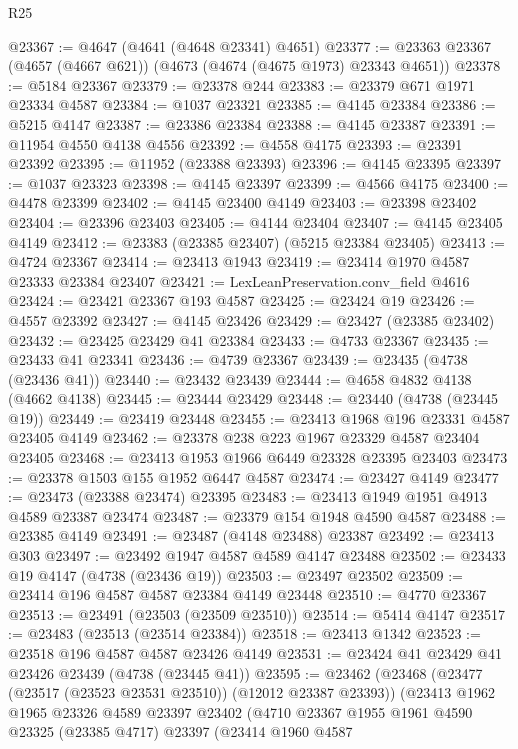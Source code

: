 \begin{lexlean}{R25}
\begin{coremodule}
@23367 := @4647 (@4641 (@4648 @23341) @4651)
@23377 := @23363 @23367 (@4657 (@4667 @621)) (@4673 (@4674 (@4675 @1973) @23343 @4651))
@23378 := @5184 @23367
@23379 := @23378 @244
@23383 := @23379 @671 @1971 @23334 @4587
@23384 := @1037 @23321
@23385 := @4145 @23384
@23386 := @5215 @4147
@23387 := @23386 @23384
@23388 := @4145 @23387
@23391 := @11954 @4550 @4138 @4556
@23392 := @4558 @4175
@23393 := @23391 @23392
@23395 := @11952 (@23388 @23393)
@23396 := @4145 @23395
@23397 := @1037 @23323
@23398 := @4145 @23397
@23399 := @4566 @4175
@23400 := @4478 @23399
@23402 := @4145 @23400 @4149
@23403 := @23398 @23402
@23404 := @23396 @23403
@23405 := @4144 @23404
@23407 := @4145 @23405 @4149
@23412 := @23383 (@23385 @23407) (@5215 @23384 @23405)
@23413 := @4724 @23367
@23414 := @23413 @1943
@23419 := @23414 @1970 @4587 @23333 @23384 @23407
@23421 := LexLeanPreservation.conv_field @4616
@23424 := @23421 @23367 @193 @4587
@23425 := @23424 @19
@23426 := @4557 @23392
@23427 := @4145 @23426
@23429 := @23427 (@23385 @23402)
@23432 := @23425 @23429 @41 @23384
@23433 := @4733 @23367
@23435 := @23433 @41 @23341
@23436 := @4739 @23367
@23439 := @23435 (@4738 (@23436 @41))
@23440 := @23432 @23439
@23444 := @4658 @4832 @4138 (@4662 @4138)
@23445 := @23444 @23429
@23448 := @23440 (@4738 (@23445 @19))
@23449 := @23419 @23448
@23455 := @23413 @1968 @196 @23331 @4587 @23405 @4149
@23462 := @23378 @238 @223 @1967 @23329 @4587 @23404 @23405
@23468 := @23413 @1953 @1966 @6449 @23328 @23395 @23403
@23473 := @23378 @1503 @155 @1952 @6447 @4587
@23474 := @23427 @4149
@23477 := @23473 (@23388 @23474) @23395
@23483 := @23413 @1949 @1951 @4913 @4589 @23387 @23474
@23487 := @23379 @154 @1948 @4590 @4587
@23488 := @23385 @4149
@23491 := @23487 (@4148 @23488) @23387
@23492 := @23413 @303
@23497 := @23492 @1947 @4587 @4589 @4147 @23488
@23502 := @23433 @19 @4147 (@4738 (@23436 @19))
@23503 := @23497 @23502
@23509 := @23414 @196 @4587 @4587 @23384 @4149 @23448
@23510 := @4770 @23367
@23513 := @23491 (@23503 (@23509 @23510))
@23514 := @5414 @4147
@23517 := @23483 (@23513 (@23514 @23384))
@23518 := @23413 @1342
@23523 := @23518 @196 @4587 @4587 @23426 @4149
@23531 := @23424 @41 @23429 @41 @23426 @23439 (@4738 (@23445 @41))
@23595 := @23462
    (@23468
      (@23477 (@23517 (@23523 @23531 @23510)) (@12012 @23387 @23393))
      (@23413
        @1962
        @1965
        @23326
        @4589
        @23397
        @23402
        (@4710
          @23367
          @1955
          @1961
          @4590
          @23325
          (@23385 @4717)
          @23397
          (@23414
            @1960
            @4587

\end{coremodule}
\end{lexlean}
